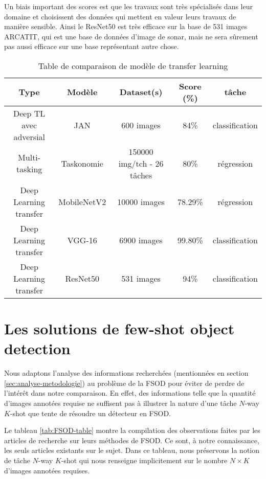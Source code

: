 Un biais important des scores est que les travaux sont très spécialisés dans leur domaine et choisissent des données qui mettent en valeur leurs travaux de manière sensible. Ainsi le ResNet50 est très efficace sur la base de 531 images ARCATIT, qui est une base de données d'image de sonar, mais ne sera sûrement pas aussi efficace sur une base représentant autre chose.

\begin{table}[]
\begin{tabular}{ccccc}
\hline
\textbf{Type}                                    & \textbf{Modèle} & \textbf{Dataset(s)} & \textbf{Score (\%)}&  \textbf{tâche}\\ \hline
Deep TL avec adversial & JAN        &  600 images &  84\% & classification\\
Multi-tasking      & Taskonomie     &  150000 img/tch - 26 tâches & 80\% & régression\\
Deep Learning transfer  & MobileNetV2  & 10000 images &   78.29\%   & régression     \\
Deep Learning transfer   & VGG-16 & 6900 images&  99.80\% & classification\\
Deep Learning transfer  & ResNet50 & 531 images&  94\% & classification \\
\end{tabular}
\caption{Table de comparaison de modèle de transfer learning}
\label{tab:generic-table}
\end{table}


\section{Les solutions de few-shot object detection}
\label{sec:analyse-FSOD}
Nous adaptons l'analyse des informations recherchées (mentionnées en section \ref{sec:analyse-metodologie}) au problème de la FSOD pour éviter de perdre de l'intérêt dans notre comparaison. En effet, des informations telle que la quantité d'images annotées requise ne suffisent pas à illustrer la nature d'une tâche $N$-way $K$-shot que tente de résoudre un détecteur en FSOD.

Le tableau \ref{tab:FSOD-table} montre la compilation des observations faites par les articles de recherche sur leurs méthodes de FSOD. Ce sont, à notre connaissance, les seuls articles existants sur le sujet. Dans ce tableau, nous préservons la notion de tâche $N$-way $K$-shot qui nous renseigne implicitement sur le nombre $N \times K$ d'images annotées requises.

